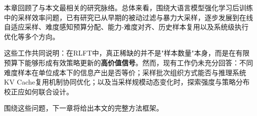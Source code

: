 本章回顾了与本文最相关的研究脉络。总体来看，围绕大语言模型强化学习后训练中的采样效率问题，已有研究已从早期的被动过滤与暴力大采样，逐步发展到在线自适应采样、难度感知预算分配、能力-难度对齐、历史样本复用以及系统级执行优化等多个方向。

这些工作共同说明：在RLFT中，真正稀缺的并不是"样本数量"本身，而是在有限预算下能够形成有效策略更新的\textbf{高价值信号}。然而，现有工作仍未充分回答：不同难度样本在单位成本下的信息产出是否等价；采样批次组织方式能否与推理系统KV Cache复用机制协同优化；以及当采样规模动态变化时，探索强度与策略分布校正应如何联合设计。

围绕这些问题，下一章将给出本文的完整方法框架。
